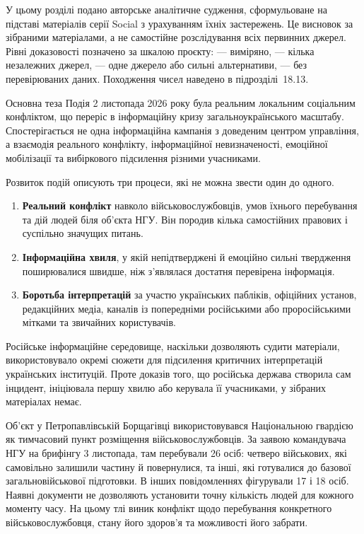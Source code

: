 
У цьому розділі подано авторське аналітичне судження, сформульоване на підставі матеріалів серії Social з урахуванням їхніх застережень. Це висновок за зібраними матеріалами, а не самостійне розслідування всіх первинних джерел. Рівні доказовості позначено за шкалою проєкту:  --- виміряно,  --- кілька незалежних джерел,  --- одне джерело або сильні альтернативи,  --- без перевірюваних даних. Походження чисел наведено в підрозділі~18.13.

\begin{keybox}{Основна теза}
Подія 2 листопада 2026 року була реальним локальним соціальним конфліктом, що переріс в інформаційну кризу загальноукраїнського масштабу. Спостерігається не одна інформаційна кампанія з доведеним центром управління, а взаємодія реального конфлікту, інформаційної невизначеності, емоційної мобілізації та вибіркового підсилення різними учасниками.
\end{keybox}

Розвиток подій описують три процеси, які не можна звести один до одного.
\begin{enumerate}
\item \textbf{Реальний конфлікт} навколо військовослужбовців, умов їхнього перебування та дій людей біля об'єкта НГУ. Він породив кілька самостійних правових і суспільно значущих питань.
\item \textbf{Інформаційна хвиля}, у якій непідтверджені й емоційно сильні твердження поширювалися швидше, ніж з'являлася достатня перевірена інформація.
\item \textbf{Боротьба інтерпретацій} за участю українських пабліків, офіційних установ, редакційних медіа, каналів із попередніми російськими або проросійськими мітками та звичайних користувачів.
\end{enumerate}
Російське інформаційне середовище, наскільки дозволяють судити матеріали, використовувало окремі сюжети для підсилення критичних інтерпретацій українських інституцій. Проте доказів того, що російська держава створила сам інцидент, ініціювала першу хвилю або керувала її учасниками, у зібраних матеріалах немає.

Об'єкт у Петропавлівській Борщагівці використовувався Національною гвардією як тимчасовий пункт розміщення військовослужбовців. За заявою командувача НГУ на брифінгу 3 листопада, там перебували 26 осіб: четверо військових, які самовільно залишили частину й повернулися, та інші, які готувалися до базової загальновійськової підготовки. В інших повідомленнях фігурували 17 і 18 осіб. Наявні документи не дозволяють установити точну кількість людей для кожного моменту часу. На цьому тлі виник конфлікт щодо перебування конкретного військовослужбовця, стану його здоров'я та можливості його забрати.

